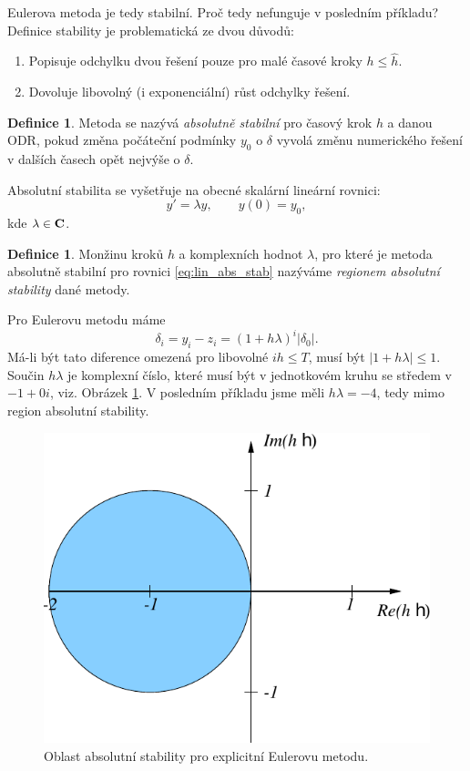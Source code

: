 \documentclass[a4paper, 12pt]{book}
\theoremstyle{definition}
\newtheorem{definition}[theorem]{Definice}
\def\abs#1{\lvert#1\rvert}
\def\df#1{\emph{#1}}
\begin{document}
Eulerova metoda je tedy stabilní. Proč tedy nefunguje v posledním příkladu? Definice stability je problematická ze dvou důvodů:
\begin{enumerate}
 \item Popisuje odchylku dvou řešení pouze pro malé časové kroky $h \le \hat h$.
 \item Dovoluje libovolný (i exponenciální) růst odchylky řešení.
\end{enumerate}

\begin{definition}
 Metoda se nazývá \df{absolutně stabilní} pro časový krok $h$ a danou ODR, pokud změna počáteční podmínky $y_0$ o $\delta$ vyvolá změnu numerického řešení v dalších 
 časech opět nejvýše o $\delta$.
\end{definition}

Absolutní stabilita se vyšetřuje na obecné skalární lineární rovnici:
\begin{equation}
  \label{eq:lin_abs_stab}
  y' = \lambda y,\qquad y(0) =y_0,
\end{equation}
kde $\lambda \in \bf{C}$.

\begin{definition}
 Monžinu kroků $h$ a komplexních hodnot $\lambda$, pro které je metoda absolutně stabilní pro rovnici \eqref{eq:lin_abs_stab}
 nazýváme \df{regionem absolutní stability} dané metody.
\end{definition}

Pro Eulerovu metodu máme
\[
    \delta_i = y_i - z_i = (1+h\lambda)^i \abs{\delta_0}.
\]
Má-li být tato diference omezená pro libovolné $ih\le T$, musí být $\abs{1+h\lambda}\le 1$. 
Součin $h\lambda$ je komplexní číslo, které musí být v jednotkovém kruhu se středem v $-1+0i$,
viz. Obrázek \ref{fig:as_explicit_euler}.
V posledním příkladu jsme měli $h\lambda = -4$, tedy mimo region absolutní stability.

\begin{figure}[h]
    \centering
    \includegraphics[scale=0.5]{as_explicit_euler.pdf}
    \caption{Oblast absolutní stability pro explicitní Eulerovu metodu.}
    \label{fig:as_explicit_euler}
\end{figure}
\end{document}
